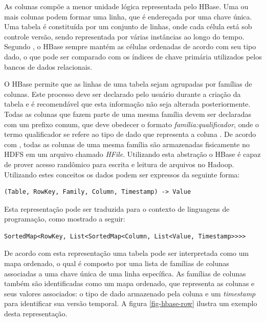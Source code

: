 As colunas compõe a menor unidade lógica representada pelo HBase. Uma ou mais colunas podem formar uma linha, que é endereçada por uma chave única. Uma tabela é constituída por um conjunto de linhas, onde cada célula está sob controle versão, sendo representada por várias instâncias ao longo do tempo. Segundo , o HBase sempre mantém as células ordenadas de acordo com seu tipo dado, o que pode ser comparado com os índices de chave primária utilizados pelos bancos de dados relacionais.

O HBase permite que as linhas de uma tabela sejam agrupadas por famílias de colunas. Este processo deve ser declarado pelo usuário durante a criação da tabela e é recomendável que esta informação não seja alterada posteriormente. Todas as colunas que fazem parte de uma mesma família devem ser declaradas com um prefixo comum, que deve obedecer o formato \textit{família:qualificador}, onde o termo qualificador se refere ao tipo de dado que representa a coluna \cite{white2012}. De acordo com , todas as colunas de uma mesma família são armazenadas fisicamente no HDFS em um arquivo chamado \textit{HFile}. Utilizando esta abstração o HBase é capaz de prover acesso randômico para escrita e leitura de arquivos no Hadoop. Utilizando estes conceitos os dados podem ser expressos da seguinte forma:

\begin{lstlisting}[style=abnt,frame=none]
(Table, RowKey, Family, Column, Timestamp) -> Value
\end{lstlisting}

Esta representação pode ser traduzida para o contexto de linguagens de programação, como mostrado a seguir:

\begin{lstlisting}[style=abnt,frame=none]
SortedMap<RowKey, List<SortedMap<Column, List<Value, Timestamp>>>>
\end{lstlisting}

De acordo com esta representação uma tabela pode ser interpretada como um mapa ordenado, o qual é composto por uma lista de famílias de colunas associadas a uma chave única de uma linha específica. As famílias de colunas também são identificadas como um mapa ordenado, que representa as colunas e seus valores associados: o tipo de dado armazenado pela coluna e um \textit{timestamp} para identificar sua versão temporal. A figura \ref{fig-hbase-row} ilustra um exemplo desta representação. 

